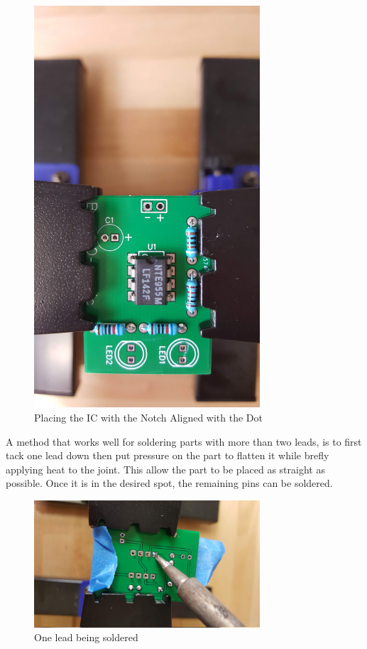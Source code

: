 \documentclass{article}
\begin{document}
\begin{enumerate}
      
\begin{figure}[H]
\caption{ Placing the IC with the Notch Aligned with the Dot }
\label{fig:img/0026.jpg}
\centering
\includegraphics[width=0.75\textwidth]{img/0026.jpg}
\end{figure}

      A method that works well for soldering parts with more than two leads, is to first tack one lead down then put pressure on the part to
      flatten it while brefly applying heat to the joint. This allow the part to be placed as straight as possible. Once it is in the desired spot, the
      remaining pins can be soldered.
      
\begin{figure}[H]
\caption{ One lead being soldered }
\label{fig:img/0029.jpg}
\centering
\includegraphics[width=0.75\textwidth]{img/0029.jpg}
\end{figure}


\end{enumerate}
\end{document}
